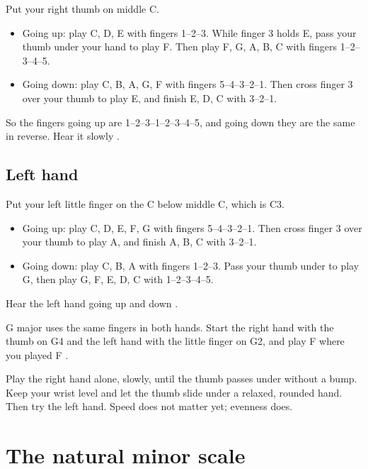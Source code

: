 Put your right thumb on middle C.
\begin{itemize}
  \item Going up: play C, D, E with fingers 1--2--3. While finger 3 holds E, pass your thumb under your hand to play F. Then play F, G, A, B, C with fingers 1--2--3--4--5.
  \item Going down: play C, B, A, G, F with fingers 5--4--3--2--1. Then cross finger 3 over your thumb to play E, and finish E, D, C with 3--2--1.
\end{itemize}

So the fingers going up are 1--2--3--1--2--3--4--5, and going down they are the same in reverse. Hear it slowly .

\subsection*{Left hand}

Put your left little finger on the C below middle C, which is C3.
\begin{itemize}
  \item Going up: play C, D, E, F, G with fingers 5--4--3--2--1. Then cross finger 3 over your thumb to play A, and finish A, B, C with 3--2--1.
  \item Going down: play C, B, A with fingers 1--2--3. Pass your thumb under to play G, then play G, F, E, D, C with 1--2--3--4--5.
\end{itemize}

Hear the left hand going up and down .

G major uses the same fingers in both hands. Start the right hand with the thumb on G4 and the left hand with the little finger on G2, and play F\sh{} where you played F .

\begin{tryitbox}
Play the right hand alone, slowly, until the thumb passes under without a bump. Keep your wrist level and let the thumb slide under a relaxed, rounded hand. Then try the left hand. Speed does not matter yet; evenness does.
\end{tryitbox}

\section{The natural minor scale}

